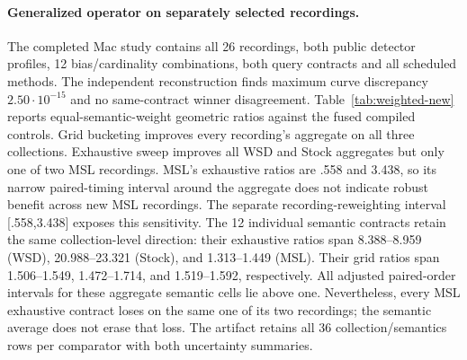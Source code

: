 \paragraph{Generalized operator on separately selected recordings.}
The completed Mac study contains all 26 recordings, both public detector
profiles, 12 bias/cardinality combinations, both query contracts and all
scheduled methods. The independent reconstruction finds maximum curve
discrepancy $2.50\cdot10^{-15}$ and no same-contract winner disagreement.
Table~\ref{tab:weighted-new} reports equal-semantic-weight geometric ratios
against the fused compiled controls. Grid bucketing improves every recording's
aggregate on all three collections. Exhaustive sweep improves all WSD and
Stock aggregates but only one of two MSL recordings. MSL's exhaustive ratios
are .558 and 3.438, so its narrow paired-timing interval around the aggregate
does not indicate robust benefit across new MSL recordings. The separate
recording-reweighting interval [.558,3.438] exposes this sensitivity.
The 12 individual semantic contracts retain the same collection-level
direction: their exhaustive ratios span 8.388--8.959 (WSD), 20.988--23.321
(Stock), and 1.313--1.449 (MSL). Their grid ratios span 1.506--1.549,
1.472--1.714, and 1.519--1.592, respectively. All adjusted paired-order
intervals for these aggregate semantic cells lie above one. Nevertheless,
every MSL exhaustive contract loses on the same one of its two recordings;
the semantic average does not erase that loss. The artifact retains all 36
collection/semantics rows per comparator with both uncertainty summaries.

